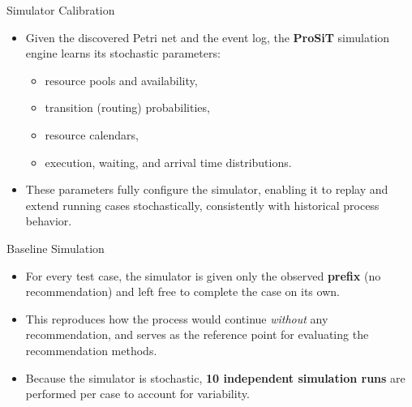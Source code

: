 \documentclass[aspectratio=169]{beamer} %
\begin{document}
\begin{frame}{Simulator Calibration}
    \begin{itemize}
        \item Given the discovered Petri net and the event log, the \textbf{ProSiT} simulation engine learns its stochastic parameters:
        \begin{itemize}
            \item resource pools and availability,
            \item transition (routing) probabilities,
            \item resource calendars,
            \item execution, waiting, and arrival time distributions.
        \end{itemize}
        \item These parameters fully configure the simulator, enabling it to replay and extend running cases stochastically, consistently with historical process behavior.
    \end{itemize}
\end{frame}

\begin{frame}{Baseline Simulation}
    \begin{itemize}
        \item For every test case, the simulator is given only the observed \textbf{prefix} (no recommendation) and left free to complete the case on its own.
        \item This reproduces how the process would continue \textit{without} any recommendation, and serves as the reference point for evaluating the recommendation methods.
        \item Because the simulator is stochastic, \textbf{10 independent simulation runs} are performed per case to account for variability.
    \end{itemize}
\end{frame}
\end{document}
